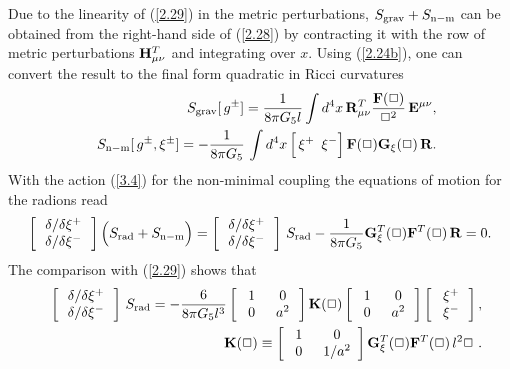\documentclass[a4paper,preprint,nofootinbib,
                 showpacs,preprintnumbers,amsmath,amssymb]{revtex4}
\begin{document}
Due to the linearity of (\ref{2.29}) in the metric perturbations, $S_{\rm 
  grav}+S_{\rm n-m}$ can be obtained from the right-hand side of (\ref{2.28}) 
by contracting it with the row of metric perturbations ${\bf H}^T_{\mu\nu}$ 
and integrating over $x$. Using (\ref{2.24b}), one can convert the result to 
the final form quadratic in Ricci curvatures 
    \begin{eqnarray} 
    &&S_{\rm grav}[\,g^\pm]=\frac1{8\pi G_5 l}\int d^4x\, 
    {\bf R}_{\mu\nu}^T 
    \frac{{\bf F}(\Box)}{\Box^2}\, 
    {\bf E}^{\mu\nu},                      \label{3.3}\\ 
    &&S_{\rm n-m}[\,g^\pm,\xi^\pm]= 
    -\frac1{8\pi G_5}\,\int d^4x\, 
    \Big[\,\xi^+\,\,\,\xi^-\Big]\, 
   {\bf F}(\Box){\bf G_\xi}(\Box)\,{\bf R}.    \label{3.4} 
    \end{eqnarray} 
With the action (\ref{3.4}) for the non-minimal coupling the equations of 
motion for the radions read 
    \begin{equation} 
    \left[\begin{array}{c} 
      \,\delta/\delta\xi^+\, \\ 
      \, \delta/\delta\xi^-\, 
    \end{array}\right]\Big(S_{\rm rad}+S_{\rm n-m}\Big)= 
    \left[\begin{array}{c} 
      \,\delta/\delta\xi^+\, \\ 
      \, \delta/\delta\xi^-\, 
    \end{array}\right]\,S_{\rm rad} 
    -\frac1{8\pi G_5} 
   {\bf G}_\xi^T(\Box){\bf F}^T(\Box)\,{\bf R}=0. 
    \end{equation} 
The comparison with (\ref{2.29}) shows that 
    \begin{eqnarray} 
    &&\left[\begin{array}{c} 
      \,\delta/\delta\xi^+\, \\ 
      \, \delta/\delta\xi^-\, 
    \end{array}\right]\,S_{\rm rad}=-\frac6{8\pi G_5 l^3} 
    \left[\begin{array}{cc} 
     \, \,1\,\,&\,0\, \\ \,\,0\,\,&\,a^2\, 
    \end{array}\right] 
    {\bf K}(\Box) 
    \left[\begin{array}{cc} 
     \, \,1\,\,&\,0\, \\ \,\,0\,\,&\,a^2\, 
    \end{array}\right]\left[\begin{array}{c} 
      \,\,\xi^+\, \\ \,\,\xi^-\, 
    \end{array}\right],                           \label{3.5}\\ 
    &&{\bf K}(\Box)\equiv 
    \left[\begin{array}{cc} 
     \, \,1\,\,&\,0 \\ \,\,0\,\,&\,1/a^2 
    \end{array}\right]{\bf G}_\xi^T(\Box) 
    {\bf F}^T(\Box)\,l^2\Box\ . 
    \end{eqnarray} 
 
\end{document}
